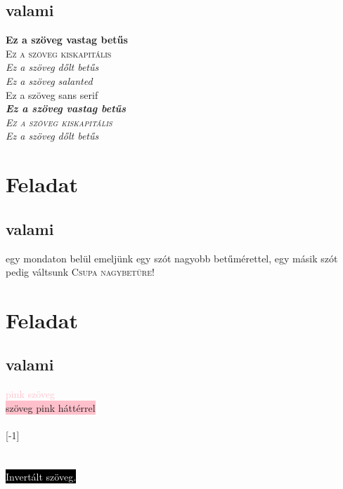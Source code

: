 \documentclass[12]{article}
\begin{document}
\subsection{valami}
\textbf{Ez a szöveg vastag betűs}\\
\textsc {Ez a szöveg kiskapitális}\\
\textit{Ez a szöveg dőlt betűs}\\
\textsl{Ez a szöveg salanted}\\
\textsf{Ez a szöveg sans serif}\\
\emph{\textbf{Ez a szöveg vastag betűs}}\\
\emph{\scshape {Ez a szöveg kiskapitális}}\\
\emph{\textit{Ez a szöveg dőlt betűs}}\\
\newpage



\section{Feladat}
\subsection{valami}
\textsf{egy mondaton belül emeljünk egy szót {\large nagyobb betűmérettel}, egy másik
szót pedig váltsunk \textsc {Csupa nagybetűre!}}\\
\newpage

\section{Feladat}
\subsection{valami}
\textcolor{pink}{pink szöveg}\\
\colorbox{pink}{szöveg pink háttérrel}\\
\\
\scalebox{1}[-1]{\scalebox{2.0}{tükrözött szöveg.}}\\
\\
\\
\textcolor{white}{\colorbox{black}{Invertált szöveg.}}\\
\\
\newpage
\end{document}
